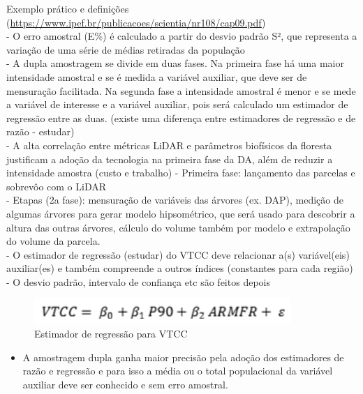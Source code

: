 \documentclass[
]{article}
\providecommand{\tightlist}{%
  \setlength{\itemsep}{0pt}\setlength{\parskip}{0pt}}
\begin{document}
Exemplo prático e definições
(\url{https://www.ipef.br/publicacoes/scientia/nr108/cap09.pdf})\\
- O erro amostral (E\%) é calculado a partir do desvio padrão S², que
representa a variação de uma série de médias retiradas da população\\
- A dupla amostragem se divide em duas fases. Na primeira fase há uma
maior intensidade amostral e se é medida a variável auxiliar, que deve
ser de mensuração facilitada. Na segunda fase a intensidade amostral é
menor e se mede a variável de interesse e a variável auxiliar, pois será
calculado um estimador de regressão entre as duas. (existe uma diferença
entre estimadores de regressão e de razão - estudar)\\
- A alta correlação entre métricas LiDAR e parâmetros biofísicos da
floresta justificam a adoção da tecnologia na primeira fase da DA, além
de reduzir a intensidade amostra (custo e trabalho) - Primeira fase:
lançamento das parcelas e sobrevôo com o LiDAR\\
- Etapas (2a fase): mensuração de variáveis das árvores (ex. DAP),
medição de algumas árvores para gerar modelo hipsométrico, que será
usado para descobrir a altura das outras árvores, cálculo do volume
também por modelo e extrapolação do volume da parcela.\\
- O estimador de regressão (estudar) do VTCC deve relacionar a(s)
variável(eis) auxiliar(es) e também compreende a outros índices
(constantes para cada região)\\
- O desvio padrão, intervalo de confiança etc são feitos depois

\begin{figure}

{\centering \includegraphics[width=0.6\linewidth]{IMAGES/eq-estimador-regressao} 

}

\caption{Estimador de regressão para VTCC}\label{fig:unnamed-chunk-6}
\end{figure}

\begin{itemize}
\tightlist
\item
  A amostragem dupla ganha maior precisão pela adoção dos estimadores de
  razão e regressão e para isso a média ou o total populacional da
  variável auxiliar deve ser conhecido e sem erro amostral.
\end{itemize}
\end{document}
